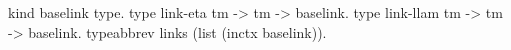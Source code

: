   kind baselink type.
  type link-eta  tm -> tm -> baselink.
  type link-llam tm -> tm -> baselink.
  typeabbrev links (list (inctx baselink)).
